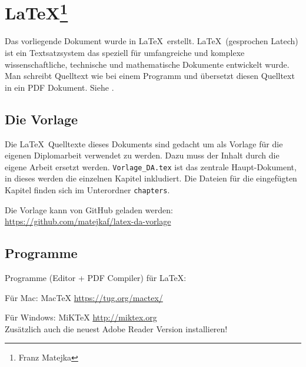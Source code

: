 


\chapter[\LaTeX ]{\LaTeX\protect\footnote{Franz Matejka}}

Das vorliegende Dokument wurde in \LaTeX\ erstellt.
\LaTeX\ (gesprochen Latech) ist ein Textsatzsystem das speziell für umfangreiche  und komplexe wissenschaftliche, technische und mathematische Dokumente entwickelt wurde.
Man schreibt Quelltext wie bei einem Programm und übersetzt diesen Quelltext in ein PDF Dokument.
Siehe \cite{bib:latexintro}.


\section{Die Vorlage}

Die \LaTeX\ Quelltexte dieses Dokuments sind gedacht um als Vorlage für die eigenen Diplomarbeit verwendet zu werden.
Dazu muss der Inhalt durch die eigene Arbeit ersetzt werden.
\verb+Vorlage_DA.tex+ ist das zentrale Haupt-Dokument, in dieses werden die einzelnen Kapitel inkludiert. Die Dateien für die eingefügten Kapitel finden sich im Unterordner \verb+chapters+.

Die Vorlage kann von GitHub geladen werden:
\url{https://github.com/matejkaf/latex-da-vorlage}

\section{Programme}

Programme (Editor + PDF Compiler) für \LaTeX:

Für Mac: MacTeX
\url{https://tug.org/mactex/}

Für Windows: MiKTeX
\url{http://miktex.org}\\
Zusätzlich auch die neuest Adobe Reader Version installieren!


